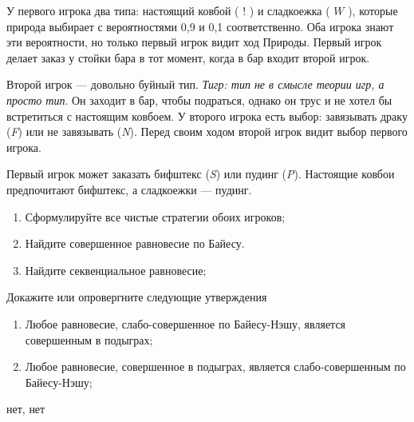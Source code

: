 \begin{problem}
{}
У первого игрока два типа: настоящий ковбой ( $!$ ) и сладкоежка ( $W$ ), которые природа выбирает с вероятностями 0,9 и 0,1 соответственно. Оба игрока знают эти вероятности, но только первый игрок видит ход Природы. Первый игрок делает заказ у стойки бара в тот момент, когда в бар входит второй игрок.\par


Второй игрок --- довольно буйный тип. {\it Тигр: тип не в смысле теории игр, а просто тип}. Он заходит в бар, чтобы подраться, однако он трус и не хотел бы встретиться с настоящим ковбоем. У второго игрока есть выбор: завязывать драку ({\it F}) или не завязывать ({\it N}). Перед своим ходом второй игрок видит выбор первого игрока.\par
Первый игрок может заказать бифштекс ({\it S}) или пудинг ({\it P}). Настоящие ковбои предпочитают бифштекс, а сладкоежки --- пудинг.
\begin{enumerate}
\item Сформулируйте все чистые стратегии обоих игроков;\par
\item Найдите совершенное равновесие по Байесу.\par
\item  Найдите секвенциальное равновесие;\par
\end{enumerate}


\begin{sol}

\end{sol}
\end{problem}



\begin{problem}
Докажите или опровергните следующие утверждения

\begin{enumerate}
\item Любое равновесие, слабо-совершенное по Байесу-Нэшу, является совершенным в подыграх;\par
\item  Любое равновесие, совершенное в подыграх, является слабо-совершенным по Байесу-Нэшу;
\end{enumerate}

\begin{sol}
нет, нет
\end{sol}
\end{problem}





